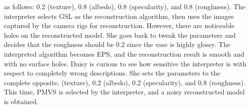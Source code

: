 as follows: 0.2 (texture), 0.8 (albedo), 0.8 (specularity), and 0.8 (roughness). The interpreter selects GSL as the reconstruction algorithm, then uses the images captured by the camera rigs for reconstruction. However, there are noticeable holes on the reconstructed model. She goes back to tweak the parameters and decides that the roughness should be 0.2 since the vase is highly glossy. The interpreted algorithm becomes EPS, and the reconstruction result is smooth and with no surface holes. Daisy is curious to see how sensitive the interpreter is with respect to completely wrong descriptions. She sets the parameters to the complete opposite,  (texture), 0.2 (albedo), 0.2 (specularity), and 0.8 (roughness). This time, PMVS is selected by the interpreter, and a noisy reconstructed model is obtained.

